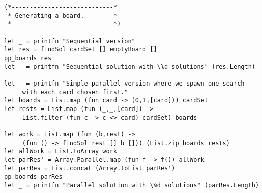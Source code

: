 \begin{lstlisting}
(*----------------------------*
 * Generating a board.        *
 *----------------------------*)

let _ = printfn "Sequential version"
let res = findSol cardSet [] emptyBoard []
pp_boards res
let _ = printfn "Sequential solution with \%d solutions" (res.Length)

let _ = printfn "Simple parallel version where we spawn one search 
     with each card chosen first."
let boards = List.map (fun card -> (0,1,[card])) cardSet
let rests = List.map (fun (_,_,[card]) -> 
     List.filter (fun c -> c <> card) cardSet) boards

let work = List.map (fun (b,rest) -> 
     (fun () -> findSol rest [] b [])) (List.zip boards rests)
let allWork = List.toArray work
let parRes' = Array.Parallel.map (fun f -> f()) allWork
let parRes = List.concat (Array.toList parRes')
pp_boards parRes
let _ = printfn "Parallel solution with \%d solutions" (parRes.Length)

\end{lstlisting}